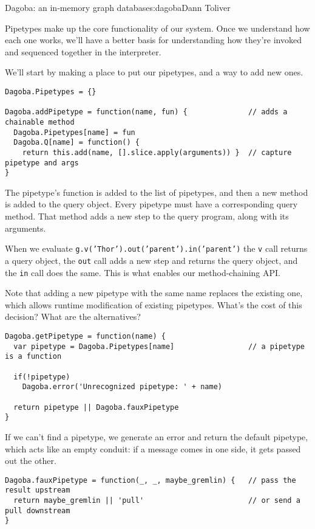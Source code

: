 \begin{aosachapter}{Dagoba: an in-memory graph database}{s:dagoba}{Dann Toliver}
\label{pipetypes}

Pipetypes make up the core functionality of our system. Once we
understand how each one works, we'll have a better basis for
understanding how they're invoked and sequenced together in the
interpreter.

We'll start by making a place to put our pipetypes, and a way to add new
ones.

\begin{verbatim}
Dagoba.Pipetypes = {}

Dagoba.addPipetype = function(name, fun) {              // adds a chainable method
  Dagoba.Pipetypes[name] = fun
  Dagoba.Q[name] = function() {
    return this.add(name, [].slice.apply(arguments)) }  // capture pipetype and args
}
\end{verbatim}

The pipetype's function is added to the list of pipetypes, and then a
new method is added to the query object. Every pipetype must have a
corresponding query method. That method adds a new step to the query
program, along with its arguments.

When we evaluate \texttt{g.v('Thor').out('parent').in('parent')} the
\texttt{v} call returns a query object, the \texttt{out} call adds a new
step and returns the query object, and the \texttt{in} call does the
same. This is what enables our method-chaining API.

Note that adding a new pipetype with the same name replaces the existing
one, which allows runtime modification of existing pipetypes. What's the
cost of this decision? What are the alternatives?

\begin{verbatim}
Dagoba.getPipetype = function(name) {
  var pipetype = Dagoba.Pipetypes[name]                 // a pipetype is a function

  if(!pipetype)
    Dagoba.error('Unrecognized pipetype: ' + name)

  return pipetype || Dagoba.fauxPipetype
}
\end{verbatim}

If we can't find a pipetype, we generate an error and return the default
pipetype, which acts like an empty conduit: if a message comes in one
side, it gets passed out the other.

\begin{verbatim}
Dagoba.fauxPipetype = function(_, _, maybe_gremlin) {   // pass the result upstream
  return maybe_gremlin || 'pull'                        // or send a pull downstream
}
\end{verbatim}


\end{aosachapter}
